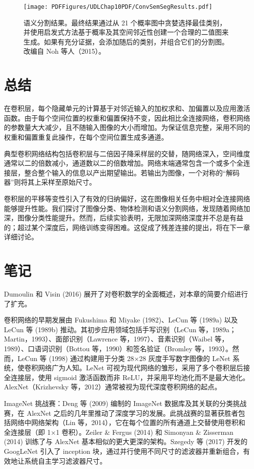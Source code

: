 \documentclass[lang=cn,newtx,10pt,scheme=chinese]{elegantbook}
\begin{document}
\begin{figure}[ht!]
	\centering
	\texttt{[image: PDFFigures/UDLChap10PDF/ConvSemSegResults.pdf]}
	\caption{语义分割结果。最终结果通过从 21 个概率图中贪婪选择最佳类别，并使用启发式方法基于概率及其空间邻近性创建一个合理的二值图来生成。如果有充分证据，会添加随后的类别，并组合它们的分割图。改编自 Noh 等人（2015）。}
\end{figure}

\section{总结}
在卷积层，每个隐藏单元的计算基于对邻近输入的加权求和、加偏置以及应用激活函数。由于每个空间位置的权重和偏置保持不变，因此相比全连接网络，卷积网络的参数量大大减少，且不随输入图像的大小而增加。为保证信息完整，采用不同的权重和偏置重复此操作，在每个空间位置生成多通道。

典型卷积网络结构包括卷积层与二倍因子降采样层的交替，随网络深入，空间维度通常以二的倍数减小，通道数以二的倍数增加。网络末端通常包含一个或多个全连接层，整合整个输入的信息以产出期望输出。若输出为图像，一个对称的“解码器”则将其上采样至原始尺寸。

卷积层的平移等变性引入了有效的归纳偏好，这在图像相关任务中相对全连接网络能够提升性能。我们探讨了图像分类、物体检测和语义分割网络，发现随着网络加深，图像分类性能提升。然而，后续实验表明，无限加深网络深度并不总是有益的；超过某个深度后，网络训练变得困难。这促成了残差连接的提出，将在下一章详细讨论。

\section{笔记}
Dumoulin 和 Visin (2016) 展开了对卷积数学的全面概述，对本章的简要介绍进行了扩充。

卷积网络的早期发展由 Fukushima 和 Miyake (1982)、LeCun 等 (1989a) 以及 LeCun 等 (1989b) 推动。其初步应用领域包括手写识别（LeCun 等，1989a；Martin，1993）、面部识别（Lawrence 等，1997）、音素识别（Waibel 等，1989）、口语词识别（Bottou 等，1990）和签名验证（Bromley 等，1993）。然而，LeCun 等 (1998) 通过构建用于分类 28×28 灰度手写数字图像的 LeNet 系统，使卷积网络广为人知。LeNet 可视为现代网络的雏形，采用了多个卷积层后接全连接层，使用 sigmoid 激活函数而非 ReLU，并采用平均池化而不是最大池化。AlexNet（Krizhevsky 等，2012）通常被视为现代深度卷积网络的起点。

ImageNet 挑战赛：Deng 等 (2009) 编制的 ImageNet 数据库及其关联的分类挑战赛，在 AlexNet 之后的几年里推动了深度学习的发展。此挑战赛的显著获胜者包括网络中网络架构（Lin 等，2014），它在每个位置的所有通道上交替使用卷积和全连接层（即 1×1 卷积）。Zeiler \& Fergus (2014) 和 Simonyan \& Zisserman (2014) 训练了与 AlexNet 基本相似的更大更深的架构。Szegedy 等 (2017) 开发的 GoogLeNet 引入了 inception 块，通过并行使用不同尺寸的滤波器并重新组合，有效地让系统自主学习滤波器尺寸。
\end{document}
